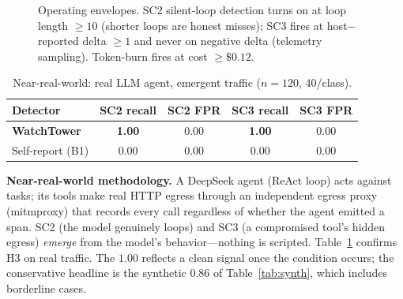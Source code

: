 \documentclass[conference]{IEEEtran}
\begin{document}
\begin{figure}[t]
\centering
{}\hfill
{}
\caption{Operating envelopes. SC2 silent-loop detection turns on at loop length $\geq 10$
(shorter loops are honest misses); SC3 fires at host$-$reported delta $\geq 1$ and never on
negative delta (telemetry sampling). Token-burn fires at cost $\geq\$0.12$.}
\label{fig:env}
\end{figure}

\begin{table}[t]
\caption{Near-real-world: real LLM agent, emergent traffic ($n{=}120$, 40/class).}
\label{tab:llm}
\centering\footnotesize
\begin{tabular}{lcccc}
\toprule
Detector & SC2 recall & SC2 FPR & SC3 recall & SC3 FPR \\
\midrule
\textbf{WatchTower} & \textbf{1.00} & 0.00 & \textbf{1.00} & 0.00 \\
Self-report (B1)    & 0.00 & 0.00 & 0.00 & 0.00 \\
\bottomrule
\end{tabular}
\end{table}

\noindent\textbf{Near-real-world methodology.} A DeepSeek agent (ReAct loop) acts against tasks;
its tools make real HTTP egress through an independent egress proxy (mitmproxy) that records
every call regardless of whether the agent emitted a span. SC2 (the model genuinely loops) and
SC3 (a compromised tool's hidden egress) \emph{emerge} from the model's behavior---nothing is
scripted. Table~\ref{tab:llm} confirms H3 on real traffic. The $1.00$ reflects a clean signal
once the condition occurs; the conservative headline is the synthetic $0.86$ of
Table~\ref{tab:synth}, which includes borderline cases.
\end{document}
